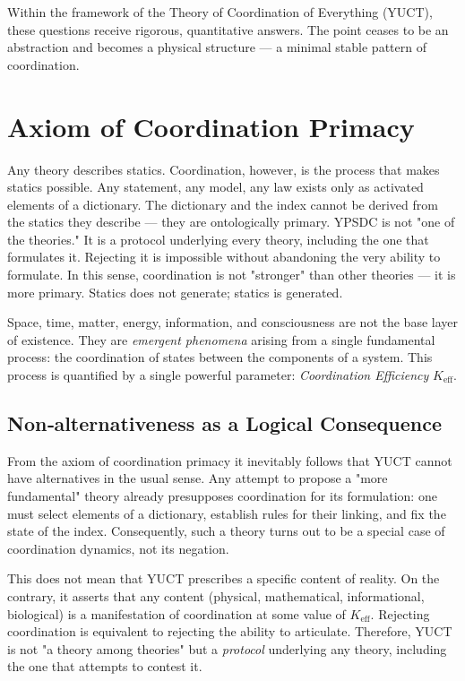 \documentclass[12pt,a4paper]{article}
\newcommand{\Keff}{K_{\mathrm{eff}}}
\begin{document}
	Within the framework of the Theory of Coordination of Everything (YUCT), these questions receive rigorous, quantitative answers. The point ceases to be an abstraction and becomes a physical structure — a minimal stable pattern of coordination.
	
	\section*{Axiom of Coordination Primacy}
	
	Any theory describes statics. Coordination, however, is the process that makes statics possible. Any statement, any model, any law exists only as activated elements of a dictionary. The dictionary and the index cannot be derived from the statics they describe — they are ontologically primary. YPSDC is not "one of the theories." It is a protocol underlying every theory, including the one that formulates it. Rejecting it is impossible without abandoning the very ability to formulate. In this sense, coordination is not "stronger" than other theories — it is more primary. Statics does not generate; statics is generated.
	
	Space, time, matter, energy, information, and consciousness are not the base layer of existence. They are \emph{emergent phenomena} arising from a single fundamental process: the coordination of states between the components of a system. This process is quantified by a single powerful parameter: \emph{Coordination Efficiency} \(\Keff\).
	
	\subsection*{Non‑alternativeness as a Logical Consequence}
	
	From the axiom of coordination primacy it inevitably follows that YUCT cannot have alternatives in the usual sense. Any attempt to propose a "more fundamental" theory already presupposes coordination for its formulation: one must select elements of a dictionary, establish rules for their linking, and fix the state of the index. Consequently, such a theory turns out to be a special case of coordination dynamics, not its negation.
	
	This does not mean that YUCT prescribes a specific content of reality. On the contrary, it asserts that any content (physical, mathematical, informational, biological) is a manifestation of coordination at some value of \(\Keff\). Rejecting coordination is equivalent to rejecting the ability to articulate. Therefore, YUCT is not "a theory among theories" but a \emph{protocol} underlying any theory, including the one that attempts to contest it.
	
\end{document}
